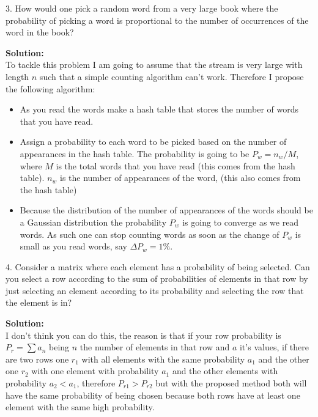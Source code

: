 \documentclass[14pt]{article}
\begin{document}
\begin{mdframed}
3. How would one pick a random word from a very large book where the
probability of picking a word is proportional to the number of
occurrences of the word in the book? \\
\end{mdframed}

\textbf{Solution:}\\

To tackle this problem I am going to assume that the stream is very
large with length $n$ such that a simple counting algorithm can't
work. Therefore I propose the following algorithm:

\begin{itemize}

\item As you read the words make a hash table that stores the number of
words that you have read.

\item Assign a probability to each word to be picked based on the number of
appearances in the hash table. The probability is going to be $P_w =
n_w/M$, where $M$ is the total words that you have read (this comes from the hash
table). $n_w$ is the number of appearances of the word, (this also
comes from the hash table)

\item Because the distribution of the number of appearances of the
words should be a Gaussian distribution the probability $P_w$ is going to
converge as we read words. As such one can stop counting words as soon
as the change of $P_w$ is small as you read words, say $\Delta P_w=1\%$.
\end{itemize}



\begin{mdframed}
4. Consider a matrix where each element has a probability of being
selected. Can you select a row according to the sum of probabilities
of elements in that row by just selecting an element according to its
probability and selecting the row that the element is in?
\end{mdframed}

\textbf{Solution:}\\

I don't think you can do this, the reason is that if your row
probability is $P_r = \sum a_n$ being $n$ the number of elements in
that row and $a$ it's values, if there are two rows one $r_1$ with all elements
with the same probability $a_1$ and the other one $r_2$ with one element
with probability $a_1$ and the other elements with probability
$a_2<a_1$, therefore $P_{r1} > P_{r2}$ but with the proposed method
both will have the same probability of being chosen because both rows have at least
one element with the same high probability.
\end{document}
